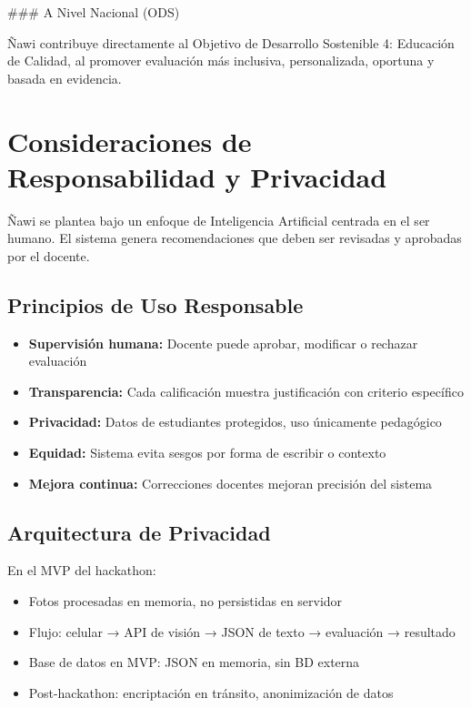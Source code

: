 \documentclass[12pt]{article}
\begin{document}
### A Nivel Nacional (ODS)

Ñawi contribuye directamente al Objetivo de Desarrollo Sostenible 4: Educación de Calidad, al promover evaluación más inclusiva, personalizada, oportuna y basada en evidencia.

\section{Consideraciones de Responsabilidad y Privacidad}

Ñawi se plantea bajo un enfoque de Inteligencia Artificial centrada en el ser humano. El sistema genera recomendaciones que deben ser revisadas y aprobadas por el docente.

\subsection{Principios de Uso Responsable}

\begin{itemize}
    \item \textbf{Supervisión humana:} Docente puede aprobar, modificar o rechazar evaluación
    \item \textbf{Transparencia:} Cada calificación muestra justificación con criterio específico
    \item \textbf{Privacidad:} Datos de estudiantes protegidos, uso únicamente pedagógico
    \item \textbf{Equidad:} Sistema evita sesgos por forma de escribir o contexto
    \item \textbf{Mejora continua:} Correcciones docentes mejoran precisión del sistema
\end{itemize}

\subsection{Arquitectura de Privacidad}

En el MVP del hackathon:

\begin{itemize}
    \item Fotos procesadas en memoria, no persistidas en servidor
    \item Flujo: celular → API de visión → JSON de texto → evaluación → resultado
    \item Base de datos en MVP: JSON en memoria, sin BD externa
    \item Post-hackathon: encriptación en tránsito, anonimización de datos
\end{itemize}
\end{document}
